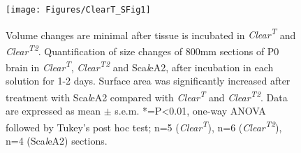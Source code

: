 \begin{figure}[hbtp]
    \begin{center}
        \texttt{[image: Figures/ClearT\_SFig1]}
        \caption[Volume changes are minimal after tissue is incubated in \emph{Clear\textsuperscript{T}} and \emph{Clear\textsuperscript{T2}}.]
        {Volume changes are minimal after tissue is incubated in \emph{Clear\textsuperscript{T}} and \emph{Clear\textsuperscript{T2}}.
        Quantification of size changes of 800mm sections of P0 brain in \emph{Clear\textsuperscript{T}}, \emph{Clear\textsuperscript{T2}} and Sca\emph{l}eA2, after incubation in each solution for 1-2 days.
        Surface area was significantly increased after treatment with Sca\emph{l}eA2 compared with \emph{Clear\textsuperscript{T}} and \emph{Clear\textsuperscript{T2}}.
        Data are expressed as mean $\pm$ s.e.m.
        *=P<0.01, one-way ANOVA followed by Tukey’s post hoc test; n=5 (\emph{Clear\textsuperscript{T}}), n=6 (\emph{Clear\textsuperscript{T2}}), n=4 (Sca\emph{l}eA2) sections.
        }
        \label{ClearTSFig1}
    \end{center}
\end{figure}

